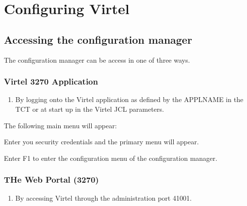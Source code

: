 \documentclass[letterpaper,10pt,english]{sphinxmanual}
\begin{document}
\chapter{Configuring Virtel}
\label{\detokenize{connectivity_guide:configuring-virtel}}\label{\detokenize{connectivity_guide:v461cn-introduction}}

\section{Accessing the configuration manager}
\label{\detokenize{connectivity_guide:accessing-the-configuration-manager}}
\sphinxAtStartPar
The configuration manager can be access in one of three ways.


\subsection{Virtel 3270 Application}
\label{\detokenize{connectivity_guide:virtel-3270-application}}\begin{enumerate}
%
\item {} 
\sphinxAtStartPar
By logging onto the Virtel application as defined by the APPLNAME in the TCT or at start up in the Virtel JCL parameters.

\end{enumerate}

\begin{sphinxVerbatim}[commandchars=\\\{\}]
 
\end{sphinxVerbatim}

\sphinxAtStartPar
The following main menu will appear:\sphinxhyphen{}

\sphinxAtStartPar
{}

\sphinxAtStartPar
Enter you security credentials and the primary menu will appear.

\sphinxAtStartPar
{}

\sphinxAtStartPar
Enter F1 to enter the configuration menu of the configuration manager.

\sphinxAtStartPar
{}

\newpage


\subsection{THe Web Portal (3270)}
\label{\detokenize{connectivity_guide:the-web-portal-3270}}\begin{enumerate}
%
\setcounter{enumi}{1}
\item {} 
\sphinxAtStartPar
By accessing Virtel through the administration port 41001.

\end{enumerate}
\end{document}
